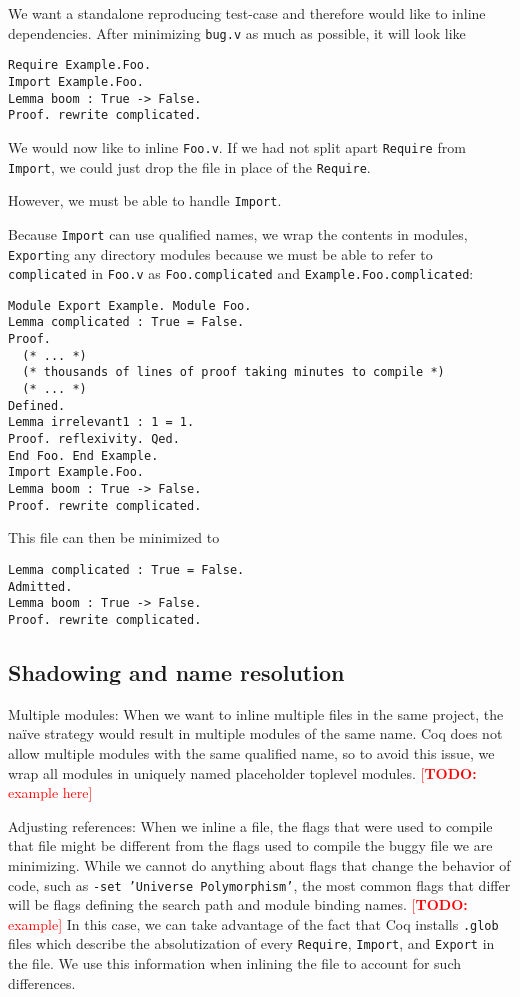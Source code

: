 \documentclass[a4paper,USenglish,cleveref,autoref,thm-restate]{lipics-v2021}
\makeatletter
\newcommand{\todo}[1]{%
\@latex@warning{TODO: \detokenize{#1} on page \thepage}%
\textcolor{red}{[\textbf{TODO:} #1]}}%
\makeatother
\begin{document}
We want a standalone reproducing test-case and therefore would like to inline dependencies.
After minimizing \verb|bug.v| as much as possible, it will look like
\begin{verbatim}
Require Example.Foo.
Import Example.Foo.
Lemma boom : True -> False.
Proof. rewrite complicated.
\end{verbatim}

We would now like to inline \verb|Foo.v|.
If we had not split apart \verb|Require| from \verb|Import|, we could just drop the file in place of the \verb|Require|.

However, we must be able to handle \verb|Import|.

Because \verb|Import| can use qualified names, we wrap the contents in modules, \verb|Export|ing any directory modules because we must be able to refer to \verb|complicated| in \verb|Foo.v| as \verb|Foo.complicated| and \verb|Example.Foo.complicated|:
\begin{verbatim}
Module Export Example. Module Foo.
Lemma complicated : True = False.
Proof.
  (* ... *)
  (* thousands of lines of proof taking minutes to compile *)
  (* ... *)
Defined.
Lemma irrelevant1 : 1 = 1.
Proof. reflexivity. Qed.
End Foo. End Example.
Import Example.Foo.
Lemma boom : True -> False.
Proof. rewrite complicated.
\end{verbatim}

This file can then be minimized to
\begin{verbatim}
Lemma complicated : True = False.
Admitted.
Lemma boom : True -> False.
Proof. rewrite complicated.
\end{verbatim}

\subsection{Shadowing and name resolution}

Multiple modules: When we want to inline multiple files in the same project, the na\"ive strategy would result in multiple modules of the same name.
Coq does not allow multiple modules with the same qualified name, so to avoid this issue, we wrap all modules in uniquely named placeholder toplevel modules.
\todo{example here}


Adjusting references: When we inline a file, the flags that were used to compile that file might be different from the flags used to compile the buggy file we are minimizing.
While we cannot do anything about flags that change the behavior of code, such as \texttt{-set 'Universe Polymorphism'}, the most common flags that differ will be flags defining the search path and module binding names.
\todo{example}
In this case, we can take advantage of the fact that Coq installs \texttt{.glob} files which describe the absolutization of every \texttt{Require}, \texttt{Import}, and \texttt{Export} in the file.
We use this information when inlining the file to account for such differences.
\end{document}
